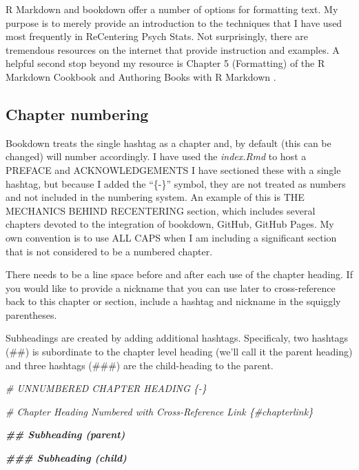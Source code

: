 \documentclass[
]{book}
\newenvironment{Shaded}{\begin{snugshade}}{\end{snugshade}}
\newcommand{\CommentTok}[1]{\textcolor[rgb]{0.56,0.35,0.01}{\textit{#1}}}
\newcommand{\DocumentationTok}[1]{\textcolor[rgb]{0.56,0.35,0.01}{\textbf{\textit{#1}}}}
\begin{document}
R Markdown and bookdown offer a number of options for formatting text. My purpose is to merely provide an introduction to the techniques that I have used most frequently in ReCentering Psych Stats. Not surprisingly, there are tremendous resources on the internet that provide instruction and examples. A helpful second stop beyond my resource is Chapter 5 (Formatting) of the R Markdown Cookbook \citep{xie_r_2021} and Authoring Books with R Markdown \citep{xie_r_2021}.

\hypertarget{chapter-numbering}{%
\subsection{Chapter numbering}\label{chapter-numbering}}

Bookdown treats the single hashtag as a chapter and, by default (this can be changed) will number accordingly. I have used the \emph{index.Rmd} to host a PREFACE and ACKNOWLEDGEMENTS I have sectioned these with a single hashtag, but because I added the ``\{-\}'' symbol, they are not treated as numbers and not included in the numbering system. An example of this is THE MECHANICS BEHIND RECENTERING section, which includes several chapters devoted to the integration of bookdown, GitHub, GitHub Pages. My own convention is to use ALL CAPS when I am including a significant section that is not considered to be a numbered chapter.

There needs to be a line space before and after each use of the chapter heading. If you would like to provide a nickname that you can use later to cross-reference back to this chapter or section, include a hashtag and nickname in the squiggly parentheses.

Subheadings are created by adding additional hashtags. Specificaly, two hashtags (\#\#) is subordinate to the chapter level heading (we'll call it the parent heading) and three hashtags (\#\#\#) are the child-heading to the parent.

\begin{Shaded}
\begin{Highlighting}[]
\CommentTok{\# UNNUMBERED CHAPTER HEADING \{{-}\}}

\CommentTok{\# Chapter Heading Numbered with Cross{-}Reference Link \{\#chapterlink\}}

\DocumentationTok{\#\# Subheading (parent)}

\DocumentationTok{\#\#\# Subheading (child)}
\end{Highlighting}
\end{Shaded}
\end{document}
